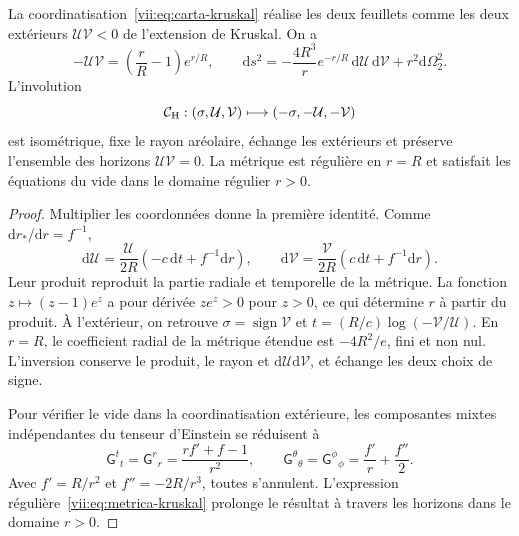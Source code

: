\begin{theorem}
\label{vii:thm:kruskal-hojas}
La coordinatisation~\eqref{vii:eq:carta-kruskal} réalise les deux feuillets comme les deux extérieurs \(\mathcal U\mathcal V<0\) de l'extension de Kruskal. On a
\begin{equation}
 -\mathcal U\mathcal V=\left(\frac rR-1\right)e^{r/R},\qquad
 \mathrm ds^2=-\frac{4R^3}{r}e^{-r/R}\,
                    \mathrm d\mathcal U\,\mathrm d\mathcal V
                    +r^2\mathrm d\Omega_2^2.
 \label{vii:eq:metrica-kruskal}
\end{equation}
L'involution
\begin{equation}
 \mathcal C_{\rm H}:(\sigma,\mathcal U,\mathcal V)
 \longmapsto(-\sigma,-\mathcal U,-\mathcal V)
 \label{vii:eq:involucion-horizonte}
\end{equation}
est isométrique, fixe le rayon aréolaire, échange les extérieurs et préserve
l'ensemble des horizons \(\mathcal U\mathcal V=0\).
La métrique est régulière en \(r=R\) et satisfait les équations du vide
dans le domaine régulier \(r>0\).
\end{theorem}
\begin{proof}
Multiplier les coordonnées donne la première identité. Comme
\(\mathrm dr_*/\mathrm dr=f^{-1}\),
\[
 \mathrm d\mathcal U=\frac{\mathcal U}{2R}
            (-c\,\mathrm dt+f^{-1}\mathrm dr),\qquad
 \mathrm d\mathcal V=\frac{\mathcal V}{2R}
            ( c\,\mathrm dt+f^{-1}\mathrm dr).
\]
Leur produit reproduit la partie radiale et temporelle de la métrique.
La fonction \(z\mapsto(z-1)e^z\) a pour dérivée \(ze^z>0\)
pour \(z>0\), ce qui détermine \(r\) à partir du produit.
À l'extérieur, on retrouve
\(\sigma=\operatorname{sign}\mathcal V\) et
\(t=(R/c)\log(-\mathcal V/\mathcal U)\).
En \(r=R\), le coefficient radial de la métrique étendue est
\(-4R^2/e\), fini et non nul. L'inversion conserve le
produit, le rayon et \(\mathrm d\mathcal U\mathrm d\mathcal V\),
et échange les deux choix de signe.

Pour vérifier le vide dans la coordinatisation extérieure, les composantes mixtes indépendantes du tenseur d'Einstein se réduisent à
\[
 \mathsf G^t{}_t=\mathsf G^r{}_r
 =\frac{rf'+f-1}{r^2},\qquad
 \mathsf G^\theta{}_\theta=\mathsf G^\phi{}_\phi
 =\frac{f'}r+\frac{f''}2.
\]
Avec \(f'=R/r^2\) et \(f''=-2R/r^3\), toutes s'annulent. L'expression régulière~\eqref{vii:eq:metrica-kruskal} prolonge le résultat à travers les horizons dans le domaine \(r>0\).
\end{proof}


